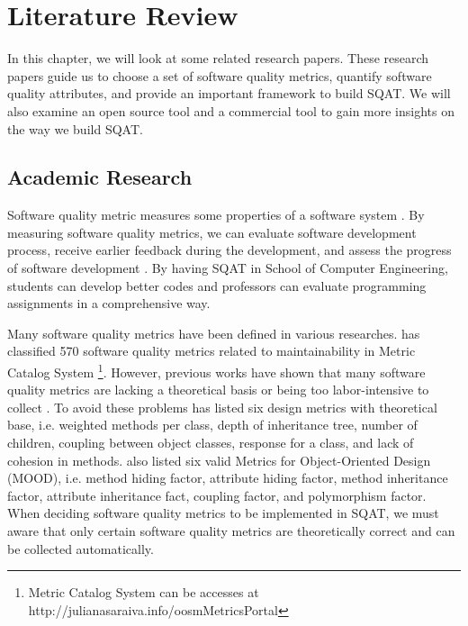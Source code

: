 \chapter{Literature Review}

In this chapter, we will look at some related research papers. These research papers guide us to choose a set of software quality metrics, quantify software quality attributes, and provide an important framework to build SQAT. We will also examine an open source tool and a commercial tool to gain more insights on the way we build SQAT. 

\section{Academic Research}

Software quality metric measures some properties of a software system \cite[]{washizaki2007framework}. By measuring software quality metrics, we can evaluate software development process, receive earlier feedback during the development, and assess the progress of software development \cite[]{yi1994goal}. By having SQAT in School of Computer Engineering, students can develop better codes and professors can evaluate programming assignments in a comprehensive way. 

Many software quality metrics have been defined in various researches. \cite{de2015classifying} has classified 570 software quality metrics related to maintainability in Metric Catalog System \footnote{Metric Catalog System can be accesses at http://julianasaraiva.info/oosmMetricsPortal}. However, previous works have shown that many software quality metrics are lacking a theoretical basis \cite[]{vessey1984research} or being too labor-intensive to collect \cite[]{kemerer1993reliability}. To avoid these problems \cite{chidamber1994metrics} has listed six design metrics with theoretical base, i.e. weighted methods per class, depth of inheritance tree, number of children, coupling between object classes, response for a class, and lack of cohesion in methods. \cite{harrison1998evaluation} also listed six valid Metrics for Object-Oriented Design (MOOD), i.e. method hiding factor, attribute hiding factor, method inheritance factor, attribute inheritance fact, coupling factor, and polymorphism factor. When deciding software quality metrics to be implemented in SQAT, we must aware that only certain software quality metrics are theoretically correct and can be collected automatically.


